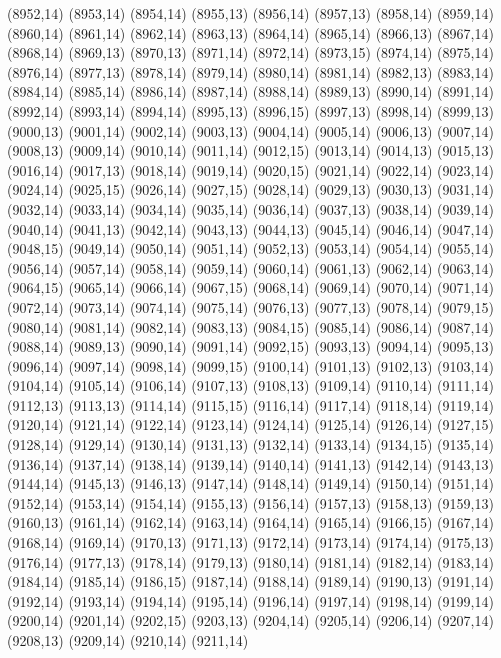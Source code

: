 (8952,14)
(8953,14)
(8954,14)
(8955,13)
(8956,14)
(8957,13)
(8958,14)
(8959,14)
(8960,14)
(8961,14)
(8962,14)
(8963,13)
(8964,14)
(8965,14)
(8966,13)
(8967,14)
(8968,14)
(8969,13)
(8970,13)
(8971,14)
(8972,14)
(8973,15)
(8974,14)
(8975,14)
(8976,14)
(8977,13)
(8978,14)
(8979,14)
(8980,14)
(8981,14)
(8982,13)
(8983,14)
(8984,14)
(8985,14)
(8986,14)
(8987,14)
(8988,14)
(8989,13)
(8990,14)
(8991,14)
(8992,14)
(8993,14)
(8994,14)
(8995,13)
(8996,15)
(8997,13)
(8998,14)
(8999,13)
(9000,13)
(9001,14)
(9002,14)
(9003,13)
(9004,14)
(9005,14)
(9006,13)
(9007,14)
(9008,13)
(9009,14)
(9010,14)
(9011,14)
(9012,15)
(9013,14)
(9014,13)
(9015,13)
(9016,14)
(9017,13)
(9018,14)
(9019,14)
(9020,15)
(9021,14)
(9022,14)
(9023,14)
(9024,14)
(9025,15)
(9026,14)
(9027,15)
(9028,14)
(9029,13)
(9030,13)
(9031,14)
(9032,14)
(9033,14)
(9034,14)
(9035,14)
(9036,14)
(9037,13)
(9038,14)
(9039,14)
(9040,14)
(9041,13)
(9042,14)
(9043,13)
(9044,13)
(9045,14)
(9046,14)
(9047,14)
(9048,15)
(9049,14)
(9050,14)
(9051,14)
(9052,13)
(9053,14)
(9054,14)
(9055,14)
(9056,14)
(9057,14)
(9058,14)
(9059,14)
(9060,14)
(9061,13)
(9062,14)
(9063,14)
(9064,15)
(9065,14)
(9066,14)
(9067,15)
(9068,14)
(9069,14)
(9070,14)
(9071,14)
(9072,14)
(9073,14)
(9074,14)
(9075,14)
(9076,13)
(9077,13)
(9078,14)
(9079,15)
(9080,14)
(9081,14)
(9082,14)
(9083,13)
(9084,15)
(9085,14)
(9086,14)
(9087,14)
(9088,14)
(9089,13)
(9090,14)
(9091,14)
(9092,15)
(9093,13)
(9094,14)
(9095,13)
(9096,14)
(9097,14)
(9098,14)
(9099,15)
(9100,14)
(9101,13)
(9102,13)
(9103,14)
(9104,14)
(9105,14)
(9106,14)
(9107,13)
(9108,13)
(9109,14)
(9110,14)
(9111,14)
(9112,13)
(9113,13)
(9114,14)
(9115,15)
(9116,14)
(9117,14)
(9118,14)
(9119,14)
(9120,14)
(9121,14)
(9122,14)
(9123,14)
(9124,14)
(9125,14)
(9126,14)
(9127,15)
(9128,14)
(9129,14)
(9130,14)
(9131,13)
(9132,14)
(9133,14)
(9134,15)
(9135,14)
(9136,14)
(9137,14)
(9138,14)
(9139,14)
(9140,14)
(9141,13)
(9142,14)
(9143,13)
(9144,14)
(9145,13)
(9146,13)
(9147,14)
(9148,14)
(9149,14)
(9150,14)
(9151,14)
(9152,14)
(9153,14)
(9154,14)
(9155,13)
(9156,14)
(9157,13)
(9158,13)
(9159,13)
(9160,13)
(9161,14)
(9162,14)
(9163,14)
(9164,14)
(9165,14)
(9166,15)
(9167,14)
(9168,14)
(9169,14)
(9170,13)
(9171,13)
(9172,14)
(9173,14)
(9174,14)
(9175,13)
(9176,14)
(9177,13)
(9178,14)
(9179,13)
(9180,14)
(9181,14)
(9182,14)
(9183,14)
(9184,14)
(9185,14)
(9186,15)
(9187,14)
(9188,14)
(9189,14)
(9190,13)
(9191,14)
(9192,14)
(9193,14)
(9194,14)
(9195,14)
(9196,14)
(9197,14)
(9198,14)
(9199,14)
(9200,14)
(9201,14)
(9202,15)
(9203,13)
(9204,14)
(9205,14)
(9206,14)
(9207,14)
(9208,13)
(9209,14)
(9210,14)
(9211,14)
